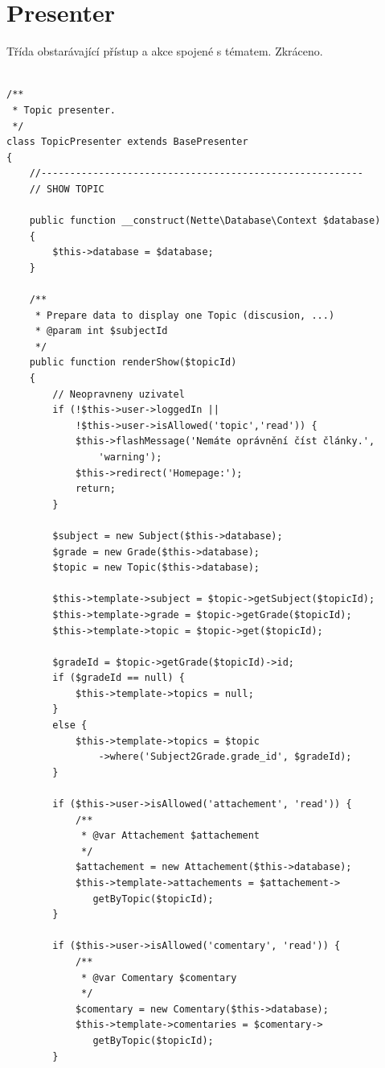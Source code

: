 \documentclass[thesis=B,czech]{FITthesis}[2012/06/26]
\begin{document}
\section{Presenter}

Třída obstarávající přístup a akce spojené s tématem. Zkráceno. 

\begin{tiny}
\begin{verbatim}

/**
 * Topic presenter.
 */
class TopicPresenter extends BasePresenter
{
    //--------------------------------------------------------
    // SHOW TOPIC
    
    public function __construct(Nette\Database\Context $database)
    {
        $this->database = $database;
    }

    /**
     * Prepare data to display one Topic (discusion, ...)
     * @param int $subjectId
     */
    public function renderShow($topicId)
    {        
        // Neopravneny uzivatel
        if (!$this->user->loggedIn ||
            !$this->user->isAllowed('topic','read')) {
            $this->flashMessage('Nemáte oprávnění číst články.',
                'warning');
            $this->redirect('Homepage:');
            return;
        }  
                
        $subject = new Subject($this->database);
        $grade = new Grade($this->database);
        $topic = new Topic($this->database);

        $this->template->subject = $topic->getSubject($topicId);
        $this->template->grade = $topic->getGrade($topicId);
        $this->template->topic = $topic->get($topicId);

        $gradeId = $topic->getGrade($topicId)->id;
        if ($gradeId == null) {
            $this->template->topics = null;
        }
        else {
            $this->template->topics = $topic
                ->where('Subject2Grade.grade_id', $gradeId);
        }
        
        if ($this->user->isAllowed('attachement', 'read')) {   
            /**
             * @var Attachement $attachement
             */
            $attachement = new Attachement($this->database);
            $this->template->attachements = $attachement->
               getByTopic($topicId);
        }
        
        if ($this->user->isAllowed('comentary', 'read')) {        
            /**
             * @var Comentary $comentary
             */
            $comentary = new Comentary($this->database);
            $this->template->comentaries = $comentary->
               getByTopic($topicId);
        }
        

\end{verbatim}
\end{tiny}
\end{document}
